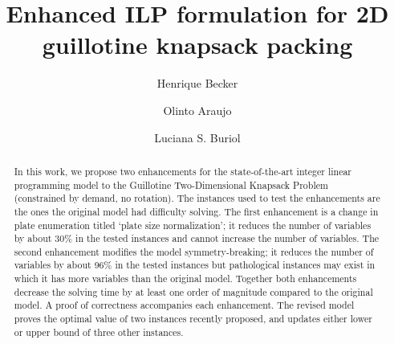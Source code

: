 \documentclass[runningheads]{llncs}
\begin{document}
\title{Enhanced ILP formulation for 2D guillotine knapsack packing}


\author{Henrique Becker \and
Olinto Araujo \and
Luciana S. Buriol}



\maketitle

\begin{abstract}

In this work, we propose two enhancements for the state-of-the-art integer linear programming model to the Guillotine Two-Dimensional Knapsack Problem (constrained by demand, no rotation).
The instances used to test the enhancements are the ones the original model had difficulty solving.
The first enhancement is a change in plate enumeration titled `plate size normalization'; it reduces the number of variables by about 30\% in the tested instances and cannot increase the number of variables. 
The second enhancement modifies the model symmetry-breaking; it reduces the number of variables by about 96\% in the tested instances but pathological instances may exist in which it has more variables than the original model.
Together both enhancements decrease the solving time by at least one order of magnitude compared to the original model.
A proof of correctness accompanies each enhancement.
The revised model proves the optimal value of two instances recently proposed, and updates either lower or upper bound of three other instances.  

\end{abstract}
\end{document}
